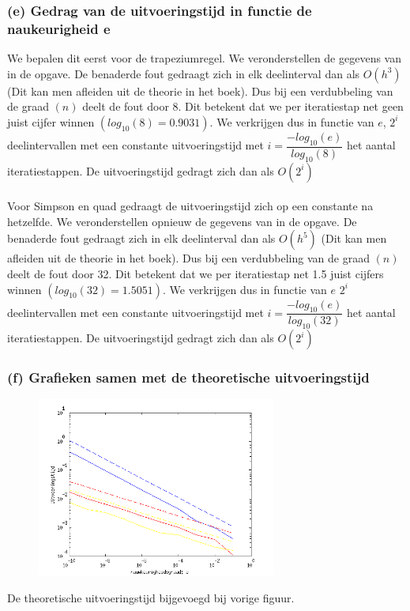 \documentclass[11pt,a4paper]{article}
\begin{document}
\subsubsection*{(e) Gedrag van de uitvoeringstijd in functie de naukeurigheid e}

We bepalen dit eerst voor de trapeziumregel. We veronderstellen de gegevens van in de opgave. De benaderde fout gedraagt zich in elk deelinterval dan als $O(h^3)$ (Dit kan men afleiden uit de theorie in het boek). Dus bij een verdubbeling van de graad $(n)$ deelt de fout door 8. Dit betekent dat we per iteratiestap net geen juist cijfer winnen $(log_{10}(8) = 0.9031)$. We verkrijgen dus in functie van $e$, $2^i$ deelintervallen met een constante uitvoeringstijd met $i =\dfrac{-log_{10}(e)}{log_{10}(8)}$ het aantal iteratiestappen. De uitvoeringstijd gedragt zich dan als $O(2^i)$
\\
\\
Voor Simpson en quad gedraagt de uitvoeringstijd zich op een constante na hetzelfde. We veronderstellen opnieuw de gegevens van in de opgave. De benaderde fout gedraagt zich in elk deelinterval dan als $O(h^5)$ (Dit kan men afleiden uit de theorie in het boek). Dus bij een verdubbeling van de graad $(n)$ deelt de fout door 32. Dit betekent dat we per iteratiestap net 1.5 juist cijfers winnen $(log_{10}(32) = 1.5051)$. We verkrijgen dus in functie van $e$ $2^i$ deelintervallen met een constante uitvoeringstijd met $i =\dfrac{-log_{10}(e)}{log_{10}(32)}$ het aantal iteratiestappen. De uitvoeringstijd gedragt zich dan als $O(2^i)$
\subsubsection*{(f) Grafieken samen met de theoretische uitvoeringstijd}
\begin{figure}[H]
	\vspace{-20pt}
	\centering
	\includegraphics[width=0.7\textwidth]{12f.png}
	\end{figure}
De theoretische uitvoeringstijd bijgevoegd bij vorige figuur.
\end{document}
